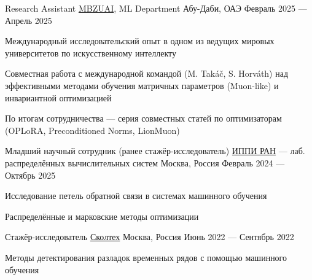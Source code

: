 \begin{cventries}
  \cventry
    {Research Assistant} %
    {\href{https://mbzuai.ac.ae/research-department/machine-learning-department/}{MBZUAI}, ML Department} %
    {Абу-Даби, ОАЭ} %
    {Февраль 2025 — Апрель 2025} %
    {
      \begin{cvitems}
        \item {Международный исследовательский опыт в одном из ведущих мировых университетов по искусственному интеллекту}
        \item {Совместная работа с международной командой (M. Tak{\'a}{\v{c}}, S. Horv{\'a}th) над эффективными методами обучения матричных параметров (Muon-like) и инвариантной оптимизацией}
        \item {По итогам сотрудничества — серия совместных статей по оптимизаторам (OPLoRA, Preconditioned Norms, LionMuon)}
      \end{cvitems}
    }

  \cventry
    {Младший научный сотрудник \textnormal{(ранее стажёр-исследователь)}} %
    {\href{http://iitp.ru/ru/researchlabs/1034.htm}{ИППИ РАН} — лаб. распределённых вычислительных систем} %
    {Москва, Россия} %
    {Февраль 2024 — Октябрь 2025} %
    {
      \begin{cvitems}
        \item {Исследование петель обратной связи в системах машинного обучения}
        \item {Распределённые и марковские методы оптимизации}
      \end{cvitems}
    }

  \cventry
    {Стажёр-исследователь} %
    {\href{https://new.skoltech.ru}{Сколтех}} %
    {Москва, Россия} %
    {Июнь 2022 — Сентябрь 2022} %
    {
      \begin{cvitems}
        \item {Методы детектирования разладок временных рядов с помощью машинного обучения}
      \end{cvitems}
    }

\end{cventries}
